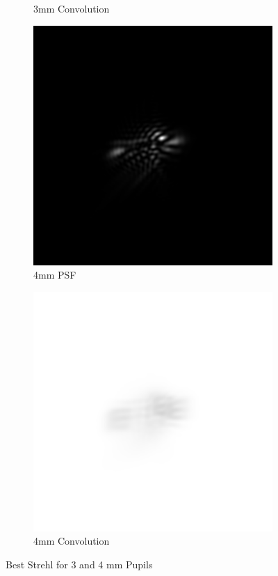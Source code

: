 \documentclass{article}
\begin{document}
\begin{figure}[H]
\begin{subfigure}{.25\textwidth}
  \caption{3mm Convolution}
  \label{fig:3mmStrehlconv}
\end{subfigure}
\begin{subfigure}{.25\textwidth}
  \centering
  \includegraphics[width=1\linewidth]{Vasha_R_G_0530_2_400_zer_-03_4_PSF.png}
  \caption{4mm PSF}
  \label{fig:4mmStrehlpsf}
\end{subfigure}%
\begin{subfigure}{.25\textwidth}
  \centering
  \includegraphics[width=1\linewidth]{Vasha_R_G_0530_2_400_zer_-03_4_PSF_convE.png}
  \caption{4mm Convolution}
  \label{fig:4mmStrehlconv}
\end{subfigure}
\caption{Best Strehl for 3 and 4 mm Pupils}
\label{fig:3and4mmStrehl}
\end{figure}
\end{document}
